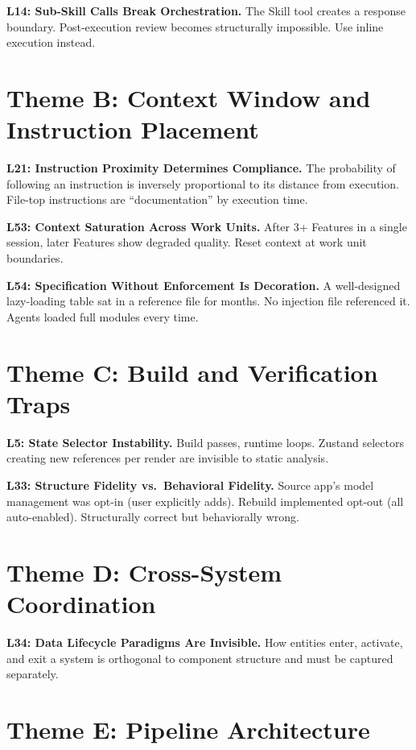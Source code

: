 \documentclass[11pt,a4paper,openright,twoside]{report}
\begin{document}
\textbf{L14: Sub-Skill Calls Break Orchestration.} The Skill tool creates a response boundary. Post-execution review becomes structurally impossible. Use inline execution instead.

\section{Theme B: Context Window and Instruction Placement}

\textbf{L21: Instruction Proximity Determines Compliance.} The probability of following an instruction is inversely proportional to its distance from execution. File-top instructions are ``documentation'' by execution time.

\textbf{L53: Context Saturation Across Work Units.} After 3+ Features in a single session, later Features show degraded quality. Reset context at work unit boundaries.

\textbf{L54: Specification Without Enforcement Is Decoration.} A well-designed lazy-loading table sat in a reference file for months. No injection file referenced it. Agents loaded full modules every time.

\section{Theme C: Build and Verification Traps}

\textbf{L5: State Selector Instability.} Build passes, runtime loops. Zustand selectors creating new references per render are invisible to static analysis.

\textbf{L33: Structure Fidelity vs.\ Behavioral Fidelity.} Source app's model management was opt-in (user explicitly adds). Rebuild implemented opt-out (all auto-enabled). Structurally correct but behaviorally wrong.

\section{Theme D: Cross-System Coordination}

\textbf{L34: Data Lifecycle Paradigms Are Invisible.} How entities enter, activate, and exit a system is orthogonal to component structure and must be captured separately.

\section{Theme E: Pipeline Architecture}
\end{document}

